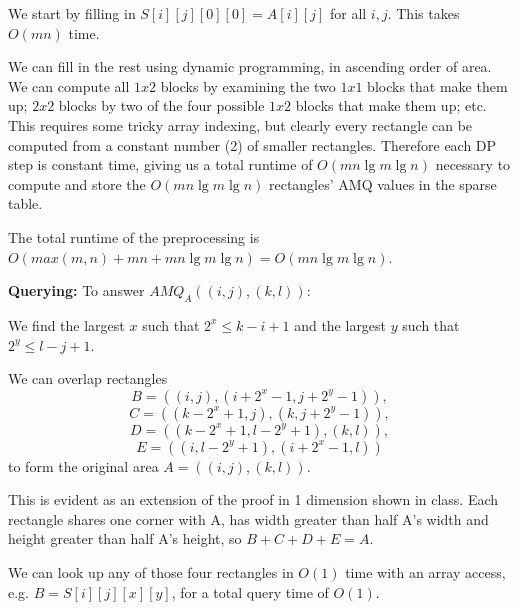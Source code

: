 \documentclass{article}
\renewcommand{\b}[1]{\textbf{#1}}
\begin{document}
\begin{enumerate}[i.]
  We start by filling in $S[i][j][0][0] = A[i][j]$ for all $i,j$. This takes $O(mn)$ time.

  We can fill in the rest using dynamic programming, in ascending order of area. We can compute all $1x2$ blocks by examining the two $1x1$ blocks that make them up; $2x2$ blocks by two of the four possible $1x2$ blocks that make them up; etc. This requires some tricky array indexing, but clearly every rectangle can be computed from a constant number (2) of smaller rectangles. Therefore each DP step is constant time, giving us a total runtime of $O(mn\lg m \lg n)$ necessary to compute and store the $O(mn\lg m \lg n)$ rectangles' AMQ values in the sparse table.

  The total runtime of the preprocessing is $O(max(m,n) + mn + mn\lg m \lg n) = O(mn\lg m \lg n)$.

  \b{Querying:} To answer $AMQ_A((i,j),(k,l))$:

  We find the largest $x$ such that $2^x \le k - i + 1$ and the largest $y$ such that $2^y \le l - j + 1$.

  We can overlap rectangles 
  $$B = ((i, j), (i + 2^x - 1, j + 2^y - 1)),$$ 
  $$C = ((k - 2^x + 1, j), (k, j + 2^y - 1)),$$
  $$D = ((k - 2^x + 1, l - 2^y + 1), (k, l)),$$
  $$E = ((i, l - 2^y + 1), (i + 2^x - 1, l))$$
  to form the original area $A = ((i,j),(k,l))$.

  This is evident as an extension of the proof in 1 dimension shown in class. Each rectangle shares one corner with A, has width greater than half A's width and height greater than half A's height, so $B+C+D+E = A$.

  We can look up any of those four rectangles in $O(1)$ time with an array access, e.g. $B = S[i][j][x][y]$, for a total query time of $O(1)$.

\end{enumerate}
\end{document}
